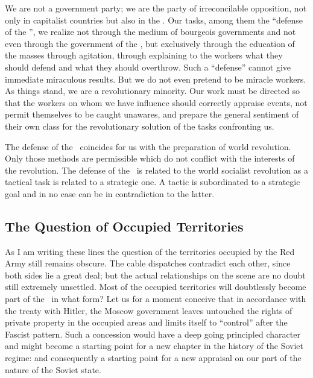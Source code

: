 We are not a government party; we are the party of irreconcilable opposition, not only in capitalist countries but also in the \USSR. Our tasks, among them the “defense of the \USSR”, we realize not through the medium of bourgeois governments and not even through the government of the \USSR, but exclusively through the education of the masses through agitation, through explaining to the workers what they should defend and what they should overthrow. Such a “defense” cannot give immediate miraculous results. But we do not even pretend to be miracle workers. As things stand, we are a revolutionary minority. Our work must be directed so that the workers on whom we have influence should correctly appraise events, not permit themselves to be caught unawares, and prepare the general sentiment of their own class for the revolutionary solution of the tasks confronting us.

The defense of the \USSR\ coincides for us with the preparation of world revolution. Only those methods are permissible which do not conflict with the interests of the revolution. The defense of the \USSR\ is related to the world socialist revolution as a tactical task is related to a strategic one. A tactic is subordinated to a strategic goal and in no case can be in contradiction to the latter.

\subsection*{The Question of Occupied Territories}

As I am writing these lines the question of the territories occupied by the Red Army still remains obscure. The cable dispatches contradict each other, since both sides lie a great deal; but the actual relationships on the scene are no doubt still extremely unsettled. Most of the occupied territories will doubtlessly become part of the \USSR\ in what form? Let us for a moment conceive that in accordance with the treaty with Hitler, the Moscow government leaves untouched the rights of private property in the occupied areas and limits itself to “control” after the Fascist pattern. Such a concession would have a deep going principled character and might become a starting point for a new chapter in the history of the Soviet regime: and consequently a starting point for a new appraisal on our part of the nature of the Soviet state.

